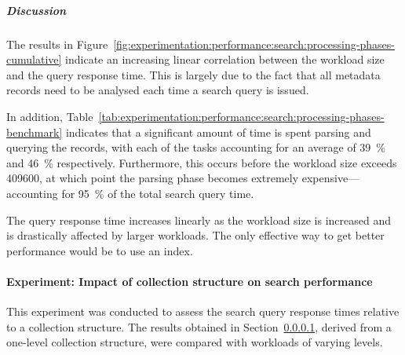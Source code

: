 %


\subparagraph{Discussion}

The results in Figure~\ref{fig:experimentation:performance:search:processing-phases-cumulative} indicate an increasing linear correlation between the workload size and the query response time. This is largely due to the fact that all metadata records need to be analysed each time a search query is issued.

In addition, Table~\ref{tab:experimentation:performance:search:processing-phases-benchmark} indicates that a significant amount of time is spent parsing and querying the records, with each of the tasks accounting for an average of \SI{39}{\percent} and \SI{46}{\percent} respectively. Furthermore, this occurs before the workload size exceeds \num{409600}, at which point the parsing phase becomes extremely expensive---accounting for \SI{95}{\percent} of the total search query time.


The query response time increases linearly as the workload size is increased and is drastically affected by larger workloads. The only effective way to get better performance would be to use an index.


\paragraph{Experiment: Impact of collection structure on search performance }
\label{sec:evaluation:performance:search-browse:experiment2}

This experiment was conducted to assess the search query response times relative to a collection structure. The results obtained in Section~\ref{sec:evaluation:performance:search-browse:experiment2}, derived from a one-level collection structure, were compared with workloads of varying levels.

